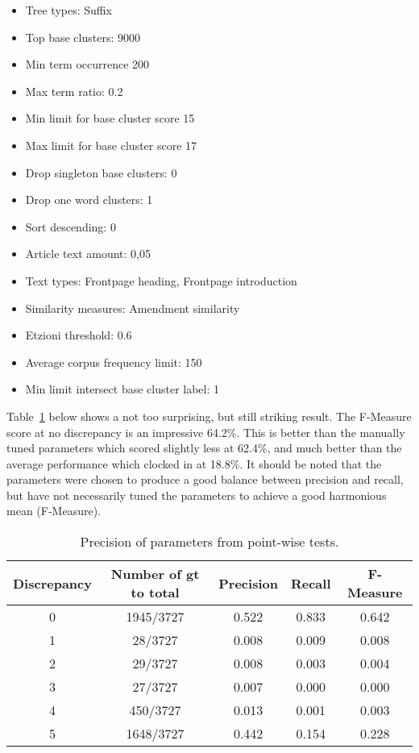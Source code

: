 \begin{itemize}
  \item Tree types: Suffix
  \item Top base clusters: 9000
  \item Min term occurrence 200
  \item Max term ratio: 0.2
  \item Min limit for base cluster score 15
  \item Max limit for base cluster score 17
  \item Drop singleton base clusters: 0
  \item Drop one word clusters: 1
  \item Sort descending: 0
  \item Article text amount: 0,05
  \item Text types: Frontpage heading, Frontpage introduction
  \item Similarity measures: Amendment similarity
  \item Etzioni threshold: 0.6
  \item Average corpus frequency limit: 150
  \item Min limit intersect base cluster label: 1
\end{itemize}

Table~\ref{tab:incrementalparametersresults} below shows a not too surprising, but still striking result. The F-Measure score at no discrepancy is an impressive 64.2\%. This is better than the manually tuned \citeauthor{Moe2014compact} parameters which scored slightly less at 62.4\%, and much better than the average performance which clocked in at 18.8\%. It should be noted that the \citeauthor{Moe2014compact} parameters were chosen to produce a good balance between precision and recall, but \cite{Moe2014compact} have not necessarily tuned the parameters to achieve a good harmonious mean (F-Measure).

\begin{table}[H]
\begin{center}
\begin{tabular}{|c|c|ccc|}
\hline
Discrepancy & Number of gt to total & Precision & Recall & F-Measure\\ 
\hline
0&   1945/3727&   0.522&    0.833&    0.642\\ 
1&   28/3727&     0.008&    0.009&    0.008\\ 
2&   29/3727&     0.008&    0.003&    0.004\\ 
3&   27/3727&     0.007&    0.000&    0.000\\
4&   450/3727&    0.013&    0.001&    0.003\\ 
5&   1648/3727&   0.442&    0.154&    0.228\\ 
\hline
\end{tabular}
\end{center}
\caption{Precision of parameters from point-wise tests.}
\label{tab:incrementalparametersresults}
\end{table}

